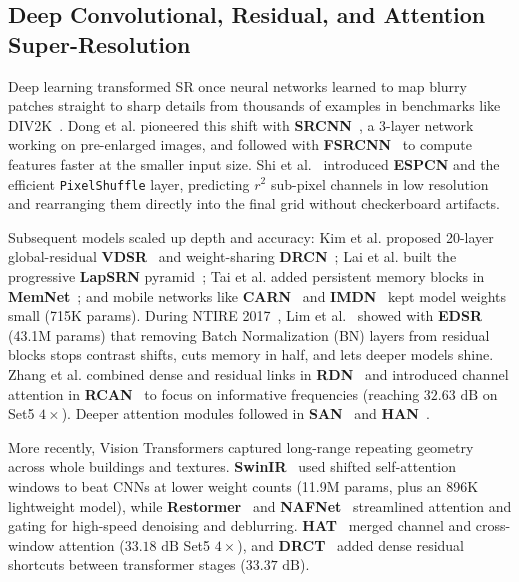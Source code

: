 \documentclass[10pt,onecolumn,journal]{IEEEtran}
\begin{document}
\subsection{Deep Convolutional, Residual, and Attention Super-Resolution}
Deep learning transformed SR once neural networks learned to map blurry patches straight to sharp details from thousands of examples in benchmarks like DIV2K~\cite{agustsson2017div2k}. Dong et al. pioneered this shift with \textbf{SRCNN}~\cite{dong2016srcnn}, a 3-layer network working on pre-enlarged images, and followed with \textbf{FSRCNN}~\cite{dong2016fsrcnn} to compute features faster at the smaller input size. Shi et al.~\cite{shi2016espcn} introduced \textbf{ESPCN} and the efficient \texttt{PixelShuffle} layer, predicting $r^2$ sub-pixel channels in low resolution and rearranging them directly into the final grid without checkerboard artifacts.

Subsequent models scaled up depth and accuracy: Kim et al. proposed 20-layer global-residual \textbf{VDSR}~\cite{kim2016vdsr} and weight-sharing \textbf{DRCN}~\cite{kim2016drcn}; Lai et al. built the progressive \textbf{LapSRN} pyramid~\cite{lai2017lapsrn}; Tai et al. added persistent memory blocks in \textbf{MemNet}~\cite{tai2017memnet}; and mobile networks like \textbf{CARN}~\cite{ahn2018carn} and \textbf{IMDN}~\cite{hui2019imdn} kept model weights small (715K params). During NTIRE 2017~\cite{agustsson2017div2k}, Lim et al.~\cite{lim2017edsr} showed with \textbf{EDSR} (43.1M params) that removing Batch Normalization (BN) layers from residual blocks stops contrast shifts, cuts memory in half, and lets deeper models shine. Zhang et al. combined dense and residual links in \textbf{RDN}~\cite{zhang2018rdn} and introduced channel attention in \textbf{RCAN}~\cite{zhang2018rcan} to focus on informative frequencies (reaching $32.63\text{ dB}$ on Set5 $4\times$). Deeper attention modules followed in \textbf{SAN}~\cite{dai2019san} and \textbf{HAN}~\cite{niu2020han}.

More recently, Vision Transformers captured long-range repeating geometry across whole buildings and textures. \textbf{SwinIR}~\cite{liang2021swinir} used shifted self-attention windows to beat CNNs at lower weight counts (11.9M params, plus an 896K lightweight model), while \textbf{Restormer}~\cite{zamir2022restormer} and \textbf{NAFNet}~\cite{chen2022nafnet} streamlined attention and gating for high-speed denoising and deblurring. \textbf{HAT}~\cite{chen2023hat} merged channel and cross-window attention ($33.18\text{ dB}$ Set5 $4\times$), and \textbf{DRCT}~\cite{hsu2024drct} added dense residual shortcuts between transformer stages ($33.37\text{ dB}$).
\end{document}
